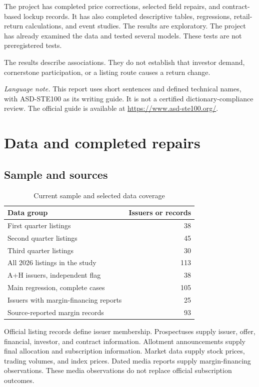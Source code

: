 \documentclass[11pt,a4paper]{article}
\begin{document}
The project has completed price corrections, selected field repairs, and contract-based lockup records.
It has also completed descriptive tables, regressions, retail-return calculations, and event studies.
The results are exploratory.
The project has already examined the data and tested several models.
These tests are not preregistered tests.

The results describe associations.
They do not establish that investor demand, cornerstone participation, or a listing route causes a return change.

{\small\textit{Language note.} This report uses short sentences and defined technical names, with ASD-STE100 as its writing guide.
It is not a certified dictionary-compliance review.
The official guide is available at \url{https://www.asd-ste100.org/}.}

\newpage
\section{Data and completed repairs}
\subsection{Sample and sources}
\begin{table}[h]
\centering
\caption{Current sample and selected data coverage}
\begin{tabular}{lr}
\toprule
Data group & Issuers or records\\
\midrule
First quarter listings & 38\\
Second quarter listings & 45\\
Third quarter listings & 30\\
All 2026 listings in the study & 113\\
A+H issuers, independent flag & 38\\
Main regression, complete cases & 105\\
Issuers with margin-financing reports & 25\\
Source-reported margin records & 93\\
\bottomrule
\end{tabular}
\end{table}

Official listing records define issuer membership.
Prospectuses supply issuer, offer, financial, investor, and contract information.
Allotment announcements supply final allocation and subscription information.
Market data supply stock prices, trading volumes, and index prices.
Dated media reports supply margin-financing observations.
These media observations do not replace official subscription outcomes.
\end{document}
